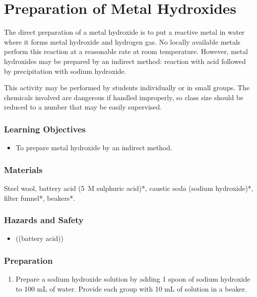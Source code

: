 \section{Preparation of Metal Hydroxides}

The direct preparation of a metal hydroxide is to put a reactive metal in water where it forms metal hydroxide and hydrogen gas. No locally available metals perform this reaction at a reasonable rate at room temperature. However, metal hydroxides may be prepared by an indirect method: reaction with acid followed by precipitation with sodium hydroxide.

This activity may be performed by students individually or in small groups. The chemicals involved are dangerous if handled improperly, so class size should be reduced to a number that may be easily supervised.

\subsubsection*{Learning Objectives}
\begin{itemize}
\item{To prepare metal hydroxide by an indirect method.}
\end{itemize}

\subsubsection*{Materials}
Steel wool, battery acid (5~M sulphuric acid)*, caustic soda (sodium hydroxide)*, filter funnel*, beakers*.

\subsubsection*{Hazards and Safety}
\begin{itemize}
\item{((battery acid))}
\end{itemize}

\subsubsection*{Preparation}
\begin{enumerate}
\item{Prepare a sodium hydroxide solution by adding 1 spoon of sodium hydroxide to 100 mL of water. Provide each group with 10 mL of solution in a beaker.}
\end{enumerate}


